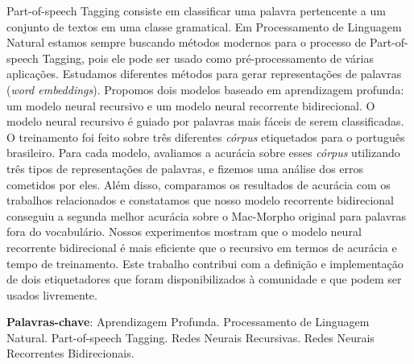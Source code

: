 \begin{resumo}
 
Part-of-speech Tagging consiste em classificar uma palavra pertencente a um conjunto de textos em uma classe gramatical. Em Processamento de Linguagem Natural estamos sempre buscando métodos modernos para o processo de Part-of-speech Tagging, pois ele pode ser usado como pré-processamento de várias aplicações. Estudamos diferentes métodos para gerar representações de palavras (\textit{word embeddings}). Propomos dois modelos baseado em aprendizagem profunda: um modelo neural recursivo e um modelo neural recorrente bidirecional. O modelo neural recursivo é guiado por palavras mais fáceis de serem classificadas. O treinamento foi feito sobre três diferentes \textit{córpus} etiquetados para o português brasileiro. Para cada modelo, avaliamos a acurácia sobre esses \textit{córpus} utilizando três tipos de representações de palavras, e fizemos uma análise dos erros cometidos por eles. Além disso, comparamos os resultados de acurácia com os trabalhos relacionados e constatamos que nosso modelo recorrente bidirecional conseguiu a segunda melhor acurácia sobre o Mac-Morpho original para palavras fora do vocabulário. Nossos experimentos mostram que o modelo neural recorrente bidirecional é mais eficiente que o recursivo em termos de acurácia e tempo de treinamento. Este trabalho contribui com a definição e implementação de dois etiquetadores que foram disponibilizados à comunidade e que podem ser usados livremente.

 \vspace{\onelineskip}
    
 \noindent
 \textbf{Palavras-chave}: Aprendizagem Profunda. Processamento de Linguagem Natural. Part-of-speech Tagging. Redes Neurais Recursivas. Redes Neurais Recorrentes Bidirecionais.
\end{resumo}


